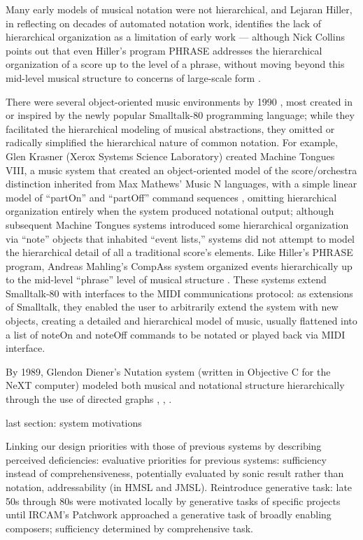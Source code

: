 \documentclass{article}
\begin{document}
Many early models of musical notation were not hierarchical, and Lejaran
Hiller, in reflecting on decades of automated notation work, identifies the
lack of hierarchical organization as a limitation of early work --- although
Nick Collins points out that even Hiller's program PHRASE addresses the
hierarchical organization of a score up to the level of a phrase, without
moving beyond this mid-level musical structure to concerns of large-scale form
\cite[108]{Collins2009}. 

There were several object-oriented music environments by 1990
\cite[139]{Polansky:1990fk}, most created in or inspired by the newly popular
Smalltalk-80 programming language; while they facilitated the hierarchical
modeling of musical abstractions, they omitted or radically simplified the
hierarchical nature of common notation. For example, Glen Krasner (Xerox
Systems Science Laboratory) created Machine Tongues VIII, a music system that
created an object-oriented model of the score/orchestra distinction inherited
from Max Mathews' Music N languages, with a simple linear model of ``partOn''
and ``partOff'' command sequences \cite{Krasner:1991uq}, omitting hierarchical
organization entirely when the system produced notational output; although
subsequent Machine Tongues systems introduced some hierarchical organization
via ``note'' objects that inhabited ``event lists,'' systems did not attempt to
model the hierarchical detail of all a traditional score's elements. Like
Hiller's PHRASE program, Andreas Mahling's CompAss system organized events
hierarchically up to the mid-level ``phrase'' level of musical structure
\cite{Mahling:1991qf}. These systems extend Smalltalk-80 with interfaces to the
MIDI communications protocol: as extensions of Smalltalk, they enabled the user
to arbitrarily extend the system with new objects, creating a detailed and
hierarchical model of music, usually flattened into a list of noteOn and
noteOff commands to be notated or played back via MIDI interface. 

By 1989, Glendon Diener's Nutation system (written in Objective C for the NeXT
computer) modeled both musical and notational structure hierarchically through
the use of directed graphs \cite{Diener:1991zr}, \cite{Diener:1991ly},
\cite{Diener:1989ve}.

last section: system motivations

Linking our design priorities with those of previous systems by describing
perceived deficiencies: evaluative priorities for previous systems: sufficiency
instead of comprehensiveness, potentially evaluated by sonic result rather than
notation, addressability (in HMSL and JMSL). Reintroduce generative task: late
50s through 80s were motivated locally by generative tasks of specific projects
until IRCAM's Patchwork approached a generative task of broadly enabling
composers; sufficiency determined by comprehensive task.
\end{document}

